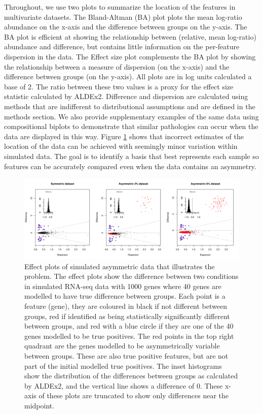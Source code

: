 \documentclass[10pt]{article}
\begin{document}
Throughout, we use two plots to summarize the location of the features in multivariate datasets. The Bland-Altman (BA) plot   plots the mean log-ratio abundance on the x-axis and the difference between groups on the y-axis. The BA plot is efficient at showing the relationship between (relative, mean log-ratio) abundance and difference, but contains little information on the per-feature dispersion in the data. The Effect size plot  complements the BA plot by showing the relationship between a measure of dispersion (on the x-axis) and the difference between groups (on the y-axis). All plots are in log units calculated a base of 2. The ratio between these two values is a proxy for the effect size statistic calculated by ALDEx2. Difference and dispersion are calculated using methods that are indifferent to distributional assumptions and are defined in the methods section. We also provide supplementary examples of the same data using compositional biplots  to demonstrate that similar pathologies can occur when the data are displayed in this way. Figure \ref{Fig:f1a} shows that incorrect estimates of the location of the data can be achieved with seemingly minor variation within simulated data. The goal is to identify a basis  that best represents each sample so features can be accurately compared even when the data contains an asymmetry.


\begin{figure}[ht]
\includegraphics[width=6in]{../figures/Fig_1.pdf}
\vspace{3mm} \caption{Effect plots  of simulated asymmetric data that illustrates the problem. The effect plots show the difference between two conditions in simulated RNA-seq data with 1000 genes where 40 genes are modelled to have true difference between groups. Each point is a feature (gene), they are coloured in black if not different between groups, red if identified as being statistically significantly different between groups, and red with a blue circle if they are one of the 40  genes modelled to be  true positives. The red points in the top right quadrant are the genes modelled to be asymmetrically variable between groups. These are also true positive features, but are not part of the initial modelled true positives. The inset histograms show the distribution of the differences between groups as calculated by ALDEx2, and the vertical line shows a difference of 0. These x-axis of these plots are truncated to show only differences near the midpoint.}
\label{Fig:f1a}
\end{figure}
\end{document}
